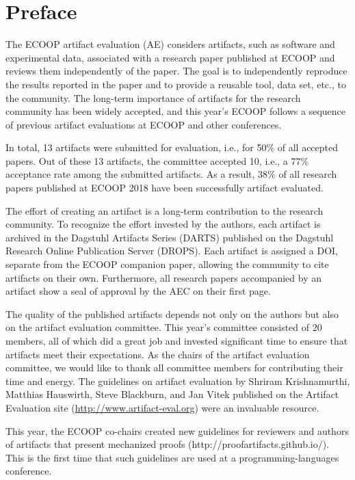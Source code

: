 \documentclass[a4paper,UKenglish]{dartsmaster}
\begin{document}
\chapter{Preface} %

The ECOOP artifact evaluation (AE) considers artifacts, such as software and
experimental data, associated with a research paper published at ECOOP and
reviews them independently of the paper. The goal is to independently
reproduce the results reported in the paper and to provide a reusable tool,
data set, etc., to the community. The long-term importance of artifacts for
the research community has been widely accepted, and this year's ECOOP
follows a sequence of previous artifact evaluations at ECOOP and other
conferences.

In total, 13 artifacts were submitted for evaluation, i.e., for 50\% of all
accepted papers. Out of these 13 artifacts, the committee accepted 10, i.e.,
a 77\% acceptance rate among the submitted artifacts. As a result, 38\% of
all research papers published at ECOOP 2018 have been successfully artifact
evaluated.

The effort of creating an artifact is a long-term contribution to the
research community. To recognize the effort invested by the authors, each
artifact is archived in the Dagstuhl Artifacts Series (DARTS) published on
the Dagstuhl Research Online Publication Server (DROPS). Each artifact is
assigned a DOI, separate from the ECOOP companion paper, allowing the
community to cite artifacts on their own. Furthermore, all research papers
accompanied by an artifact show a seal of approval by the AEC on their first
page.

The quality of the published artifacts depends not only on the authors but
also on the artifact evaluation committee. This year's committee consisted
of 20 members, all of which did a great job and invested significant time to
ensure that artifacts meet their expectations. As the chairs of the artifact
evaluation committee, we would like to thank all committee members for
contributing their time and energy. The
guidelines on artifact evaluation by Shriram Krishnamurthi, Matthias
Hauswirth, Steve Blackburn, and Jan Vitek published on the Artifact
Evaluation site (\url{http://www.artifact-eval.org}) were an invaluable resource.

This year, the ECOOP co-chairs created new guidelines for reviewers and authors of artifacts that present mechanized proofs (http://proofartifacts.github.io/). 
This is the first time that such guidelines
are used at a programming-languages conference.
\end{document}
